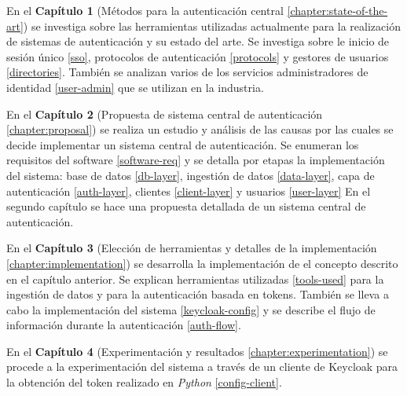 En el \textbf{Capítulo 1} (Métodos para la autenticación central \ref{chapter:state-of-the-art}) se investiga sobre las herramientas utilizadas actualmente para la realización de sistemas de autenticación y su estado del arte. Se investiga sobre le inicio de sesión único \ref{sso}, protocolos de autenticación \ref{protocols} y gestores de usuarios \ref{directories}. También se analizan varios de los servicios administradores de identidad \ref{user-admin} que se utilizan en la industria.

En el \textbf{Capítulo 2} (Propuesta de sistema central de autenticación \ref{chapter:proposal}) se realiza un estudio y análisis de las causas por las cuales se decide implementar un sistema central de autenticación. Se enumeran los requisitos del software \ref{software-req} y se detalla por etapas la implementación del sistema: base de datos \ref{db-layer}, ingestión de datos \ref{data-layer}, capa de autenticación \ref{auth-layer}, clientes \ref{client-layer} y usuarios \ref{user-layer}
En el segundo capítulo se hace una propuesta detallada de un sistema central de autenticación. 

En el \textbf{Capítulo 3} (Elección de herramientas y detalles de la implementación \ref{chapter:implementation}) se desarrolla la implementación de el concepto descrito en el capítulo anterior. Se explican herramientas utilizadas \ref{tools-used} para la ingestión de datos y para la autenticación basada en tokens. También se lleva a cabo la implementación del sistema \ref{keycloak-config} y se describe el flujo de información durante la autenticación \ref{auth-flow}.

En el \textbf{Capítulo 4} (Experimentación y resultados \ref{chapter:experimentation}) se procede a la experimentación del sistema a través de un cliente de Keycloak para la obtención del token realizado en \textit{Python} \ref{config-client}.